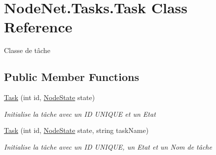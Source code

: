 \hypertarget{class_node_net_1_1_tasks_1_1_task}{}\section{Node\+Net.\+Tasks.\+Task Class Reference}
\label{class_node_net_1_1_tasks_1_1_task}


Classe de tâche  


\subsection*{Public Member Functions}
\begin{DoxyCompactItemize}
\item 
\hyperlink{class_node_net_1_1_tasks_1_1_task_a894afaafcc8404e357ebc1d1ff0c94a5}{Task} (int id, \hyperlink{namespace_node_net_1_1_network_1_1_states_a0c130cd0043f8c509dddba2cf1fd2f36}{Node\+State} state)
\begin{DoxyCompactList}\small\item\em Initialise la tâche avec un ID U\+N\+I\+Q\+UE et un Etat \end{DoxyCompactList}\item 
\hyperlink{class_node_net_1_1_tasks_1_1_task_a860eaf574b2c7b69181d459c5ec3d4d3}{Task} (int id, \hyperlink{namespace_node_net_1_1_network_1_1_states_a0c130cd0043f8c509dddba2cf1fd2f36}{Node\+State} state, string task\+Name)
\begin{DoxyCompactList}\small\item\em Initialise la tâche avec un ID U\+N\+I\+Q\+UE, un Etat et un Nom de tâche \end{DoxyCompactList}\end{DoxyCompactItemize}
